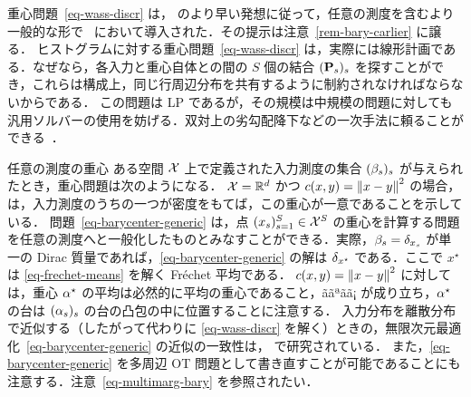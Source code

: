 重心問題~\eqref{eq-wass-discr} は，\citet{carlierekelandmatching} のより早い発想に従って，任意の測度を含むより一般的な形で~\citet{Carlier_wasserstein_barycenter} において導入された．その提示は注意~\ref{rem-bary-carlier} に譲る． %
ヒストグラムに対する重心問題~\eqref{eq-wass-discr} は，実際には線形計画である．なぜなら，各入力と重心自体との間の $S$ 個の結合 $(\P_s)_s$ を探すことができ，これらは構成上，同じ行周辺分布を共有するように制約されなければならないからである．
この問題は LP であるが，その規模は中規模の問題に対しても汎用ソルバーの使用を妨げる．双対上の劣勾配降下などの一次手法に頼ることができる~\citep{Carlier-NumericsBarycenters}．

\begin{rem2}{任意の測度の重心}\label{rem-bary-carlier}
	ある空間 $\X$ 上で定義された入力測度の集合 $(\be_s)_s$ が与えられたとき，重心問題は次のようになる．
	$\X=\RR^d$ かつ $c(x,y)=\norm{x-y}^2$ の場合，\citet{Carlier_wasserstein_barycenter} は，入力測度のうちの一つが密度をもてば，この重心が一意であることを示している．
	問題~\eqref{eq-barycenter-generic} は，点 $(x_s)_{s=1}^S \in \X^S$ の重心を計算する問題を任意の測度へと一般化したものとみなすことができる．実際，$\be_s=\de_{x_s}$ が単一の Dirac 質量であれば，\eqref{eq-barycenter-generic} の解は $\de_{x^\star}$ である．ここで $x^\star$ は \eqref{eq-frechet-means} を解く Fr\'echet 平均である．
	$c(x,y)=\norm{x-y}^2$ に対しては，重心 $\al^\star$ の平均は必然的に平均の重心であること，ããªãã¡	
	が成り立ち，$\al^\star$ の台は $(\al_s)_s$ の台の凸包の中に位置することに注意する．
	入力分布を離散分布で近似する（したがって代わりに \eqref{eq-wass-discr} を解く）ときの，無限次元最適化~\eqref{eq-barycenter-generic} の近似の一致性は，\citet{Carlier-NumericsBarycenters} で研究されている．
	また，\eqref{eq-barycenter-generic} を多周辺 OT 問題として書き直すことが可能であることにも注意する．注意~\ref{eq-multimarg-bary} を参照されたい．
\end{rem2}

